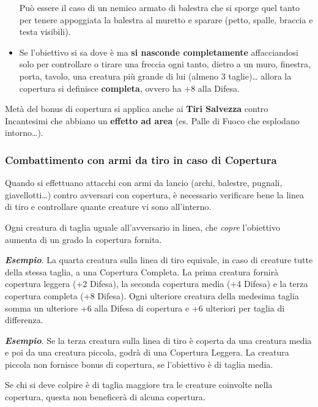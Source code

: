 \begin{multicols}{2}
\begin{itemize}[leftmargin=*]
Può essere il caso di un nemico armato di balestra che si sporge quel tanto per tenere appoggiata la balestra al muretto e sparare (petto, spalle, braccia e testa visibili).

\item
Se l'obiettivo si sa dove è ma \textbf{si nasconde completamente} affacciandosi solo per controllare o tirare una freccia ogni tanto, dietro a un muro, finestra, porta, tavolo, una creatura più grande di lui (almeno 3 taglie)… allora la copertura si definisce \textbf{completa}, ovvero ha +8 alla Difesa.

\end{itemize}

Metà del bonus di copertura si applica anche ai \textbf{Tiri Salvezza} contro Incantesimi che abbiano un \textbf{effetto ad area} (es. Palle di Fuoco che esplodano intorno…).

\subsubsection{Combattimento con armi da tiro in caso di Copertura}\label{esempicopertura}\hypertarget{esempicopertura}{}

Quando si effettuano attacchi con armi da lancio (archi, balestre, pugnali, giavellotti…) contro avversari con copertura, è necessario verificare bene la linea di tiro e controllare quante creature vi sono all'interno.

Ogni creatura di taglia uguale all'avversario in linea, che \emph{copre} l'obiettivo aumenta di un grado la copertura fornita.

\textbf{\textit{Esempio}}. La quarta creatura sulla linea di tiro equivale, in caso di creature tutte della stessa taglia, a una Copertura Completa. La prima creatura fornirà copertura leggera (+2 Difesa), la seconda copertura media (+4 Difesa) e la terza copertura completa (+8 Difesa). Ogni ulteriore creatura della medesima taglia somma un ulteriore +6 alla Difesa di copertura e +6 ulteriori per taglia di differenza.

\textbf{\textit{Esempio}}. Se la terza creatura sulla linea di tiro è coperta da una creatura media e poi da una creatura piccola, godrà di una Copertura Leggera. La creatura piccola non fornisce bonus di copertura, se l'obiettivo è di taglia media.

Se chi si deve colpire è di taglia maggiore tra le creature coinvolte nella copertura, questa non beneficerà di alcuna copertura.


\end{multicols}
